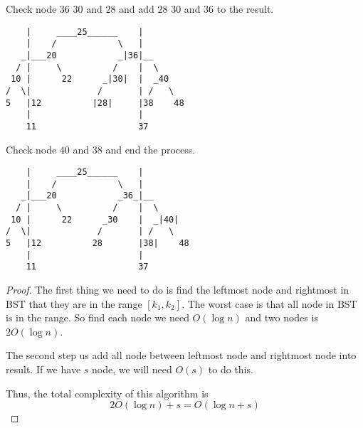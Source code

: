 \documentclass{article}
\begin{document}
Check node $36$ $30$ and $28$ and add $28$ $30$ and $36$ to the result.
\begin{lstlisting}
    |     ____25______    |
    |    /            \   |
   _|___20            _|36|__
  / |     \          /    |  \
 10 |      22      _|30|  |  _40
/  \|             /       | /   \
5   |12          |28|     |38    48
    |                     |
    11                    37
\end{lstlisting}
\newpage
Check node $40$ and $38$ and end the process.
\begin{lstlisting}
    |     ____25______    |
    |    /            \   |
   _|___20            _36_|__
  / |     \          /    |  \
 10 |      22      _30    |  _|40|
/  \|             /       | /   \
5   |12          28       |38|    48
    |                     |
    11                    37
\end{lstlisting}
\begin{proof}
    The first thing we need to do is find the leftmost node and rightmost in BST that they are in the range $[k_1,k_2]$. The worst case is that all node in BST is in the range. So find each node we need $O(\log n)$ and two nodes is $2O(\log n)$.

    The second step us add all node between leftmost node and rightmost node into result. If we have $s$ node, we will need $O(s)$ to do this.
    
    Thus, the total complexity of this algorithm is $$2O(\log n)+s=O(\log n+s)$$

\end{proof}
\end{document}
